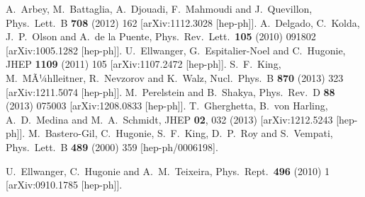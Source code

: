 \documentclass[final,3p,times]{elsarticle}
\begin{document}
\begin{thebibliography}{10}
  A.~Arbey, M.~Battaglia, A.~Djouadi, F.~Mahmoudi and J.~Quevillon,
  Phys.\ Lett.\ B {\bf 708} (2012) 162
  [arXiv:1112.3028 [hep-ph]].
  A.~Delgado, C.~Kolda, J.~P.~Olson and A.~de la Puente,
  Phys.\ Rev.\ Lett.\  {\bf 105} (2010) 091802
  [arXiv:1005.1282 [hep-ph]].
  U.~Ellwanger, G.~Espitalier-Noel and C.~Hugonie,
  JHEP {\bf 1109} (2011) 105
  [arXiv:1107.2472 [hep-ph]].
  S.~F.~King, M.~MÃ¼hlleitner, R.~Nevzorov and K.~Walz,
  Nucl.\ Phys.\ B {\bf 870} (2013) 323
  [arXiv:1211.5074 [hep-ph]].
  M.~Perelstein and B.~Shakya,
  Phys.\ Rev.\ D {\bf 88} (2013) 075003
  [arXiv:1208.0833 [hep-ph]].
  T.~Gherghetta, B.~von Harling, A.~D.~Medina and M.~A.~Schmidt,
  JHEP {\bf 02}, 032 (2013)
  [arXiv:1212.5243 [hep-ph]].
  M.~Bastero-Gil, C.~Hugonie, S.~F.~King, D.~P.~Roy and S.~Vempati,
  Phys.\ Lett.\ B {\bf 489} (2000) 359
  [hep-ph/0006198].

  U.~Ellwanger, C.~Hugonie and A.~M.~Teixeira,
  Phys.\ Rept.\  {\bf 496} (2010) 1
  [arXiv:0910.1785 [hep-ph]].


\end{thebibliography}
\end{document}
